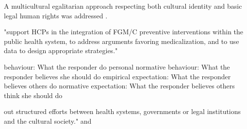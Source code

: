 \documentclass[12pt,]{article}
\newcommand{\comment}[1]{\textbf{[[#1]]}}
\newcommand{\cfcmt}[1]{\comment{CFS: #1}}
\begin{document}

A multicultural egalitarian approach respecting both cultural identity and basic legal human rights was addressed \cite{BoylCarb10, Wade11}.  




"support HCPs in the integration of FGM/C preventive interventions within the public health system, to address arguments favoring medicalization, and to use data to design appropriate strategies." \cite{KaplRiba16}


behaviour:  What the responder do 
personal normative behaviour:  What the responder believes she should do
empirical expectation:  What the responder believes others do
normative expectation: What the responder believes others think she should do


\cite{UNFPA14, UNIC16}

out structured efforts between health systems, governments or legal institutions and the cultural society." \cite{Iyio12} and 
\end{document}
